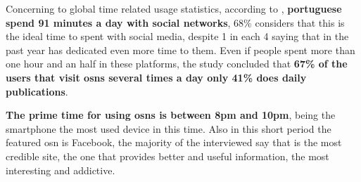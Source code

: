 \indent Concerning to global time related usage statistics, according to \citep{marktest2016}, \textbf{portuguese spend 91 minutes a day with social networks},
68\% considers that this is the ideal time to spent with social media, despite 1 in each 4 saying that in the past year has dedicated even more time to them.
Even if people spent more than one hour and an half in these platforms, the study
concluded that \textbf{67\% of the users that visit \glspl{osn} several times a day only 41\% does daily publications}.

\indent \textbf{The prime time for using \glspl{osn} is between 8pm and 10pm}, being the smartphone the most used device in this time. Also in this short period the
featured \gls{osn} is Facebook, the majority of the interviewed say that is the most credible site, the one that provides better and useful information,
the most interesting and addictive.
